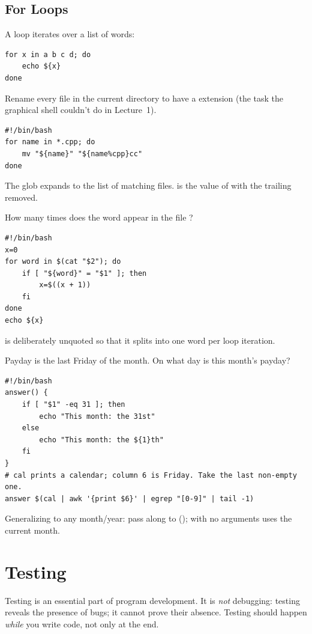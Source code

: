 \subsection{For Loops}
A  loop iterates over a list of words:
\begin{lstlisting}[style=bash]
for x in a b c d; do
    echo ${x}
done
\end{lstlisting}

\begin{example}
Rename every  file in the current directory to have a 
extension (the task the graphical shell couldn't do in Lecture~1).
\begin{lstlisting}[style=bash]
#!/bin/bash
for name in *.cpp; do
    mv "${name}" "${name%cpp}cc"
done
\end{lstlisting}
The glob  expands to the list of matching files. 
is the value of  with the trailing  removed.
\end{example}

\begin{example}
How many times does the word  appear in the file ?
\begin{lstlisting}[style=bash]
#!/bin/bash
x=0
for word in $(cat "$2"); do
    if [ "${word}" = "$1" ]; then
        x=$((x + 1))
    fi
done
echo ${x}
\end{lstlisting}
 is deliberately unquoted so that it splits into one word
per loop iteration.
\end{example}

\begin{example}
Payday is the last Friday of the month. On what day is this month's payday?
\begin{lstlisting}[style=bash]
#!/bin/bash
answer() {
    if [ "$1" -eq 31 ]; then
        echo "This month: the 31st"
    else
        echo "This month: the ${1}th"
    fi
}
# cal prints a calendar; column 6 is Friday. Take the last non-empty one.
answer $(cal | awk '{print $6}' | egrep "[0-9]" | tail -1)
\end{lstlisting}
Generalizing to any month/year: pass  along to 
(); with no arguments  uses the current month.
\end{example}

\section{Testing}
Testing is an essential part of program development. It is \emph{not}
debugging: testing reveals the presence of bugs; it cannot prove their
absence. Testing should happen \emph{while} you write code, not only at the end.

